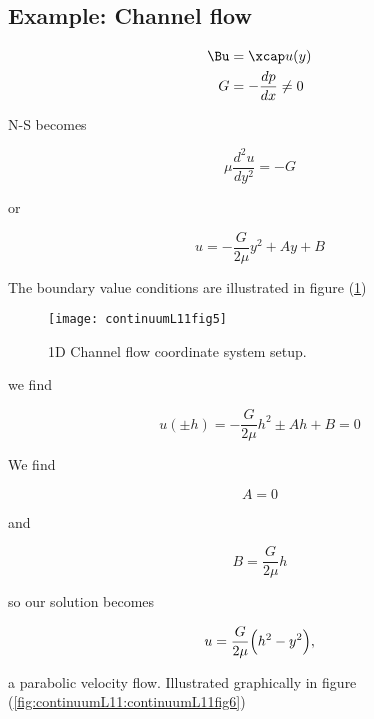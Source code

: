 \subsection{Example: Channel flow}

\begin{align}\label{eqn:continuumL11:570}
\Bu &= \xcap u(y) \\
G &= - \frac{dp}{dx} \ne 0
\end{align}

N-S becomes

\begin{equation}\label{eqn:continuumL11:590}
\mu \frac{d^2 u}{dy^2} = -G
\end{equation}

or

\begin{equation}\label{eqn:continuumL11:610}
u = -\frac{G}{2 \mu} y^2 + A y + B
\end{equation}

The boundary value conditions are illustrated in figure (\ref{fig:continuumL11:continuumL11fig5})

\begin{figure}[htp]
   \centering
   \texttt{[image: continuumL11fig5]}
   \caption{1D Channel flow coordinate system setup.}\label{fig:continuumL11:continuumL11fig5}
\end{figure}

we find

\begin{equation}\label{eqn:continuumL11:630}
u(\pm h) = 
-\frac{G}{2 \mu} h^2 \pm A h + B = 0
\end{equation}

We find

\begin{equation}\label{eqn:continuumL11:650}
A = 0
\end{equation}

and 

\begin{equation}\label{eqn:continuumL11:670}
B = \frac{G}{2 \mu} h
\end{equation}

so our solution becomes

\begin{equation}\label{eqn:continuumL11:690}
u = \frac{G}{2 \mu} \Bigl( h^2 - y^2 \Bigr),
\end{equation}

a parabolic velocity flow.  Illustrated graphically in figure (\ref{fig:continuumL11:continuumL11fig6})

